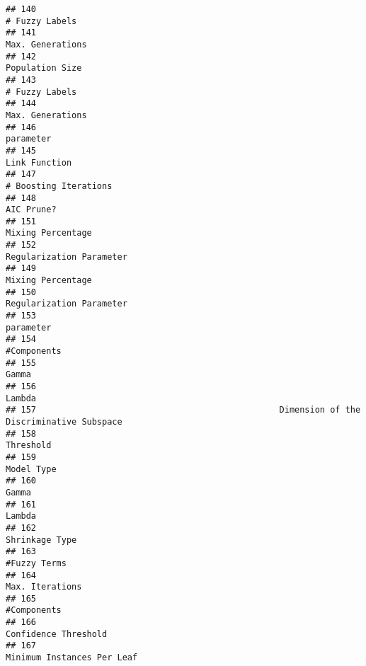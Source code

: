 \documentclass[
]{article}
\begin{document}
\begin{verbatim}
## 140                                                                          # Fuzzy Labels
## 141                                                                        Max. Generations
## 142                                                                         Population Size
## 143                                                                          # Fuzzy Labels
## 144                                                                        Max. Generations
## 146                                                                               parameter
## 145                                                                           Link Function
## 147                                                                   # Boosting Iterations
## 148                                                                              AIC Prune?
## 151                                                                       Mixing Percentage
## 152                                                                Regularization Parameter
## 149                                                                       Mixing Percentage
## 150                                                                Regularization Parameter
## 153                                                                               parameter
## 154                                                                             #Components
## 155                                                                                   Gamma
## 156                                                                                  Lambda
## 157                                                Dimension of the Discriminative Subspace
## 158                                                                               Threshold
## 159                                                                              Model Type
## 160                                                                                   Gamma
## 161                                                                                  Lambda
## 162                                                                          Shrinkage Type
## 163                                                                            #Fuzzy Terms
## 164                                                                         Max. Iterations
## 165                                                                             #Components
## 166                                                                    Confidence Threshold
## 167                                                              Minimum Instances Per Leaf

\end{verbatim}
\end{document}
